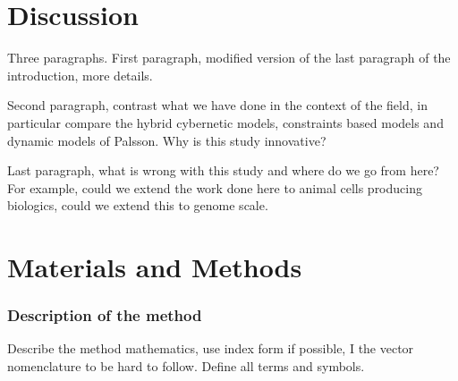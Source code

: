 \documentclass[10pt,twocolumn,twoside,final]{IEEEtran}
\begin{document}
\section{Discussion}
Three paragraphs.
First paragraph, modified version of the last paragraph of the introduction, more details.

Second paragraph, contrast what we have done in the context of the field, in particular compare the hybrid cybernetic models, constraints based models and dynamic models of
Palsson. Why is this study innovative?

Last paragraph, what is wrong with this study and where do we go from here? For example,
could we extend the work done here to animal cells producing biologics, could we extend this to genome scale.

\section{Materials and Methods}

\noindent\subsubsection*{Description of the method}
Describe the method mathematics, use index form if possible, I the vector nomenclature to be hard to follow. Define all terms and symbols.
\end{document}
